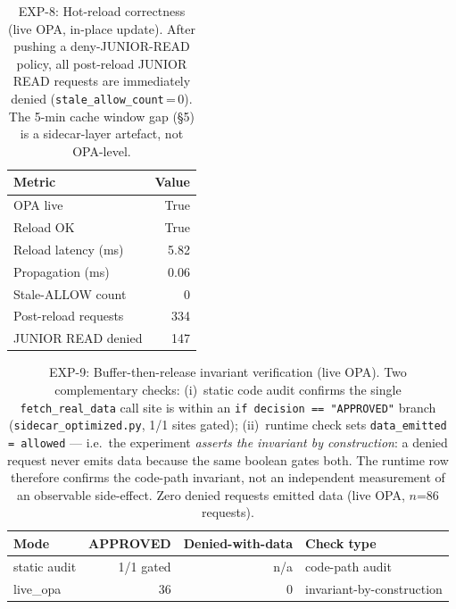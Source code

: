 \begin{table}[t]
\centering
\small
\caption{EXP-8: Hot-reload correctness (live OPA, in-place update).
  After pushing a deny-JUNIOR-READ policy, all post-reload JUNIOR READ
  requests are immediately denied (\texttt{stale\_allow\_count}\,=\,0).
  The 5-min cache window gap (\S5) is a sidecar-layer artefact, not OPA-level.}
\label{tab:exp8-reload}
\begin{tabular}{lr}
\hline
\textbf{Metric} & \textbf{Value} \\
\hline
OPA live              & True  \\
Reload OK             & True  \\
Reload latency (ms)   & 5.82  \\
Propagation (ms)      & 0.06  \\
Stale-ALLOW count     & 0     \\
Post-reload requests  & 334   \\
JUNIOR READ denied    & 147   \\
\hline
\end{tabular}
\end{table}

\begin{table}[t]
\centering
\small
\caption{EXP-9: Buffer-then-release invariant verification (live OPA).
  Two complementary checks: (i)~static code audit confirms the single
  \texttt{fetch\_real\_data} call site is within an
  \texttt{if decision == "APPROVED"} branch
  (\texttt{sidecar\_optimized.py}, 1/1 sites gated);
  (ii)~runtime check sets \texttt{data\_emitted = allowed} — i.e.\ the
  experiment \emph{asserts the invariant by construction}: a denied request
  never emits data because the same boolean gates both.
  The runtime row therefore confirms the code-path invariant, not an
  independent measurement of an observable side-effect.
  Zero denied requests emitted data (live OPA, $n$=86 requests).}
\label{tab:exp9-rbs}
\begin{tabular}{lrrl}
\hline
\textbf{Mode} & \textbf{APPROVED} & \textbf{Denied-with-data} & \textbf{Check type} \\
\hline
static audit & 1/1 gated & n/a & code-path audit \\
live\_opa    & 36        &   0 & invariant-by-construction \\
\hline
\end{tabular}
\end{table}

